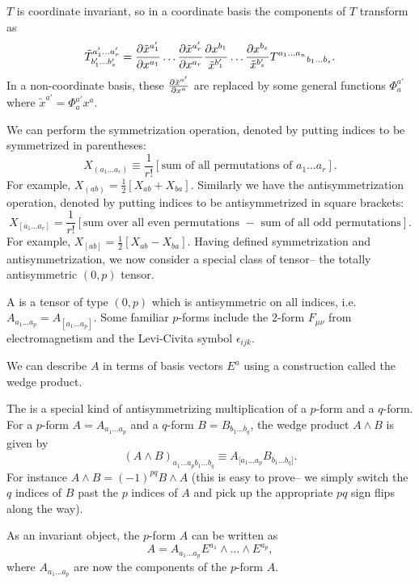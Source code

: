 $T$ is coordinate invariant, so in a coordinate basis the components of $T$ transform as
$${\tilde T^{a_1'\ldots a_r'}}_{b_1'\ldots b_s'}=\frac{\partial \tilde x^{a_1'}}{\partial x^{a_1}} \ldots \frac{\partial \tilde x^{a_r'}}{\partial x^{a_r}} \frac{\partial x^{b_1}}{\tilde x^{b_1'}} \ldots \frac{\partial x^{b_s}}{\tilde x^{b_s'}} {T^{a_1\ldots a_n}}_{b_1\ldots b_s}.$$
In a non-coordinate basis, these $\frac{\partial \tilde x^{a'}}{\partial x^a}$ are replaced by some general functions $\Phi ^{a'}_a$ where $\tilde x^{a'}=\Phi^{a'}_a x^a$.

We can perform the symmetrization operation, denoted by putting indices to be symmetrized in parentheses:
$$X_{(a_1 \ldots a_r)}\equiv \frac{1}{r!}\left[\text{sum of all permutations of }a_1\ldots a_r\right].$$
For example, $X_{(ab)}=\frac{1}{2}\left[X_{ab}+X_{ba}\right]$. Similarly we have the antisymmetrization operation, denoted by putting indices to be antisymmetrized in square brackets:
$$X_{[a_1\ldots a_r]}=\frac{1}{r!}\left[\text{sum over all even permutations } - \text { sum of all odd permutations}\right].$$
For example, $X_{[ab]}=\frac{1}{2}[X_{ab}-X_{ba}].$ Having defined symmetrization and antisymmetrization, we now consider a special class of tensor-- the totally antisymmetric $(0,p)$ tensor.

\begin{defn}
A  is a tensor of type $(0,p)$ which is antisymmetric on all indices, i.e. $A_{a_1\ldots a_p}=A_{[a_1 \ldots a_p]}$. Some familiar $p$-forms include the $2$-form $F_{\mu\nu}$ from electromagnetism and the Levi-Civita symbol $\epsilon_{ijk}$.
\end{defn}
We can describe $A$ in terms of basis vectors $E^a$ using a construction called the wedge product.
\begin{defn}
The  is a special kind of antisymmetrizing multiplication of a $p$-form and a $q$-form. For a $p$-form $A=A_{a_1\ldots a_p}$ and a $q$-form $B=B_{b_1\ldots b_q}$, the wedge product $A\wedge B$ is given by
$$(A\wedge B)_{a_1\ldots a_p b_1 \ldots b_q}\equiv A_{[a_1\ldots a_p}B_{b_1\ldots b_q]}.$$
For instance $A\wedge B = (-1)^{pq}B \wedge A$ (this is easy to prove-- we simply switch the $q$ indices of $B$ past the $p$ indices of $A$ and pick up the appropriate $pq$ sign flips along the way).
\end{defn}
As an invariant object, the $p$-form $A$ can be written as $$A=A_{a_1\ldots a_p} E^{a_1}\wedge \ldots \wedge E^{a_p},$$ where $A_{a_1\ldots a_p}$ are now the components of the $p$-form $A$.

